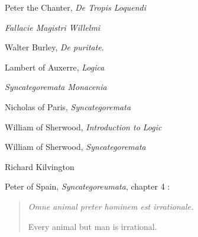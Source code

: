 \documentclass{article}
\begin{document}
Peter the Chanter, {\em De Tropis Loquendi} \cite{modernorum22}

{\em Fallacie Magistri Willelmi} \cite{modernorum22}













Walter Burley, {\em De puritate}.

Lambert of Auxerre, {\em Logica} \cite[pp.~102--162]{CTMPT}

{\em Syncategoremata Monacenia} \cite[pp.~163--173]{CTMPT}

Nicholas of Paris, {\em Syncategoremata} \cite[pp.~174--215]{CTMPT}

William of Sherwood, {\em Introduction to Logic}

William of Sherwood, {\em Syncategoremata} \cite{syncategorematic}

Richard Kilvington \cite{kilvington}








Peter of Spain, {\em Syncategoreumata}, chapter 4 \cite{syncategoreumata}:

\begin{quote}
{\em Omne animal preter hominem est irrationale.}

Every animal but man is irrational.
\end{quote}















\end{document}
